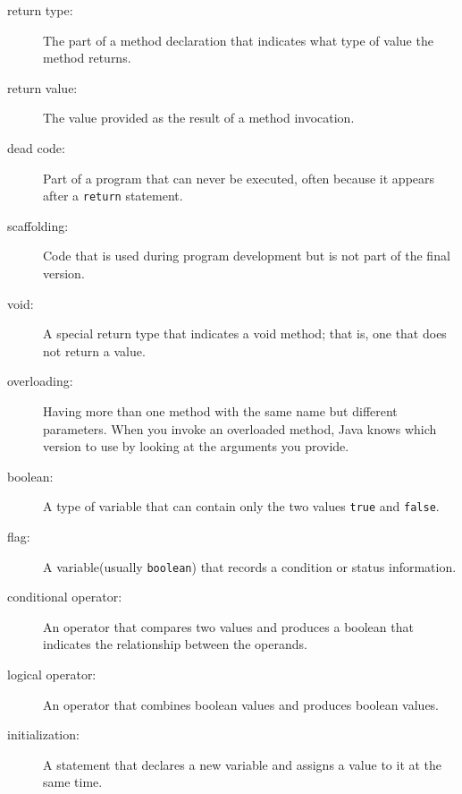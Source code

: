 \documentclass{book}
\begin{document}
\begin{description}

\item[return type:]  The part of a method declaration that indicates
what type of value the method returns.

\item[return value:]  The value provided as the result of a method
invocation.

\item[dead code:]  Part of a program that can never be executed,
often because it appears after a {\tt return} statement.

\item[scaffolding:]  Code that is used during program development
but is not part of the final version.

\item[void:]  A special return type that indicates a void method;
that is, one that does not return a value.

\item[overloading:]  Having more than one method with the same name
but different parameters.  When you invoke an overloaded method,
Java knows which version to use by looking at the arguments you
provide.

\item[boolean:]  A type of variable that can contain only the two
values {\tt true} and {\tt false}.

\item[flag:]  A variable(usually {\tt boolean}) that records
a condition or status information.

\item[conditional operator:]  An operator that compares two values
and produces a boolean that indicates the relationship between the
operands.

\item[logical operator:]  An operator that combines boolean values
and produces boolean values.

\item[initialization:]  A statement that declares a new variable
and assigns a value to it at the same time.


\end{description}
\end{document}
